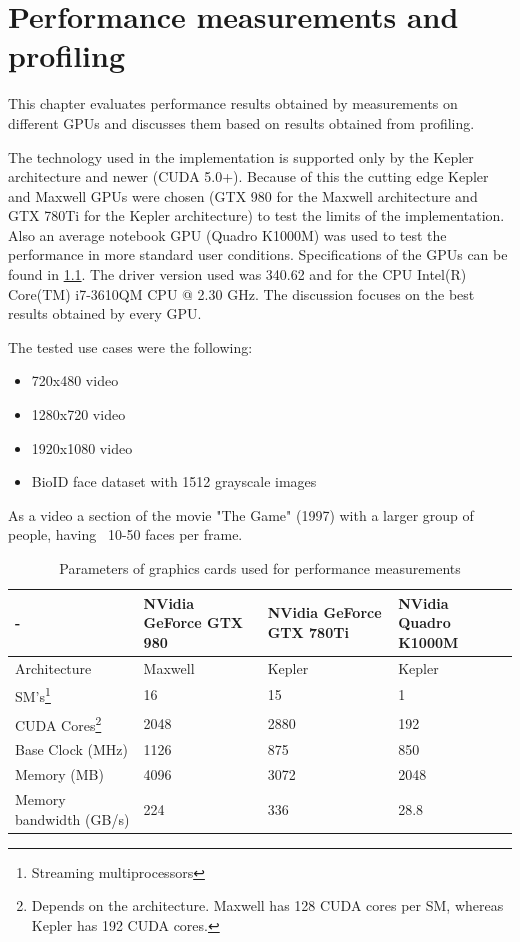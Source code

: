 \chapter{Performance measurements and profiling}

This chapter evaluates performance results obtained by measurements on different GPUs and discusses them based on results obtained from profiling.

The technology used in the implementation  is supported only by the Kepler architecture and newer (CUDA 5.0+). Because of this the cutting edge Kepler and Maxwell GPUs were chosen (GTX 980 for the Maxwell architecture and GTX 780Ti for the Kepler architecture) to test the limits of the implementation. Also an average notebook GPU (Quadro K1000M) was used to test the performance in more standard user conditions. Specifications of the GPUs can be found in \ref{tab:parameters-gpu}. The driver version used was 340.62 and for the CPU Intel(R) Core(TM) i7-3610QM CPU @ 2.30 GHz. The discussion focuses on the best results obtained by every GPU.

The tested use cases were the following:

\begin{itemize}
	\item 720x480 video
	\item 1280x720 video
	\item 1920x1080 video
	\item BioID face dataset with 1512 grayscale images
\end{itemize}

As a video a section of the movie "The Game" (1997) with a larger group of people, having ~10-50 faces per frame.

\begin{center}
\begin{table}[htbp]
\begin{tabularx}{\textwidth}{| X | X | X | X |}
\hline
- & NVidia GeForce GTX 980 & NVidia GeForce GTX 780Ti & NVidia Quadro K1000M \\
\hline
Architecture & Maxwell & Kepler & Kepler \\
\hline
SM's\footnote{Streaming multiprocessors} & 16 & 15 & 1 \\
\hline
CUDA Cores\footnote{Depends on the architecture. Maxwell has 128 CUDA cores per SM, whereas Kepler has 192 CUDA cores.} & 2048 & 2880 & 192 \\
\hline
Base Clock (MHz) & 1126 & 875 & 850 \\
\hline
Memory (MB) & 4096 & 3072 & 2048 \\
\hline
Memory bandwidth (GB/s) & 224 & 336 & 28.8 \\
\hline
\end{tabularx}
\caption{Parameters of graphics cards used for performance measurements}
\label{tab:parameters-gpu}
\end{table}
\end{center}

